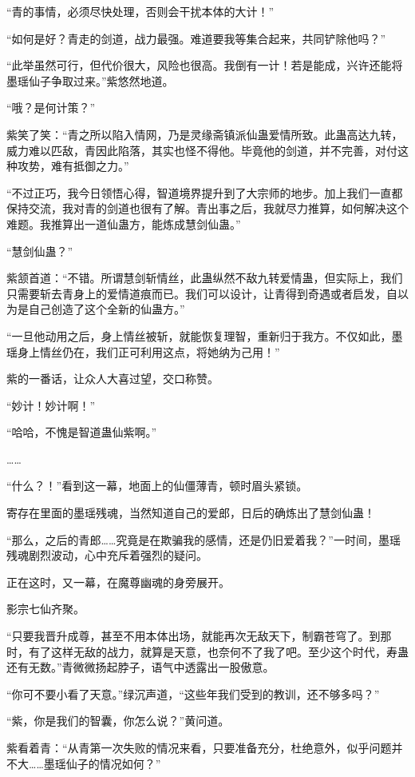 \begin{this_body}
“青的事情，必须尽快处理，否则会干扰本体的大计！”

“如何是好？青走的剑道，战力最强。难道要我等集合起来，共同铲除他吗？”

“此举虽然可行，但代价很大，风险也很高。我倒有一计！若是能成，兴许还能将墨瑶仙子争取过来。”紫悠然地道。

“哦？是何计策？”

紫笑了笑：“青之所以陷入情网，乃是灵缘斋镇派仙蛊爱情所致。此蛊高达九转，威力难以匹敌，青因此陷落，其实也怪不得他。毕竟他的剑道，并不完善，对付这种攻势，难有抵御之力。”

“不过正巧，我今日领悟心得，智道境界提升到了大宗师的地步。加上我们一直都保持交流，我对青的剑道也很有了解。青出事之后，我就尽力推算，如何解决这个难题。我推算出一道仙蛊方，能炼成慧剑仙蛊。”

“慧剑仙蛊？”

紫颔首道：“不错。所谓慧剑斩情丝，此蛊纵然不敌九转爱情蛊，但实际上，我们只需要斩去青身上的爱情道痕而已。我们可以设计，让青得到奇遇或者启发，自以为是自己创造了这个全新的仙蛊方。”

“一旦他动用之后，身上情丝被斩，就能恢复理智，重新归于我方。不仅如此，墨瑶身上情丝仍在，我们正可利用这点，将她纳为己用！”

紫的一番话，让众人大喜过望，交口称赞。

“妙计！妙计啊！”

“哈哈，不愧是智道蛊仙紫啊。”

……

“什么？！”看到这一幕，地面上的仙僵薄青，顿时眉头紧锁。

寄存在里面的墨瑶残魂，当然知道自己的爱郎，日后的确炼出了慧剑仙蛊！

“那么，之后的青郎……究竟是在欺骗我的感情，还是仍旧爱着我？”一时间，墨瑶残魂剧烈波动，心中充斥着强烈的疑问。

正在这时，又一幕，在魔尊幽魂的身旁展开。

影宗七仙齐聚。

“只要我晋升成尊，甚至不用本体出场，就能再次无敌天下，制霸苍穹了。到那时，有了这样无敌的战力，就算是天意，也奈何不了我了吧。至少这个时代，寿蛊还有无数。”青微微扬起脖子，语气中透露出一股傲意。

“你可不要小看了天意。”绿沉声道，“这些年我们受到的教训，还不够多吗？”

“紫，你是我们的智囊，你怎么说？”黄问道。

紫看着青：“从青第一次失败的情况来看，只要准备充分，杜绝意外，似乎问题并不大……墨瑶仙子的情况如何？”


\end{this_body}
